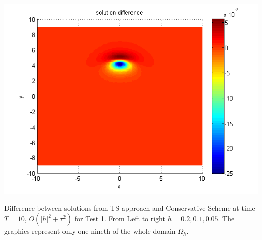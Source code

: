 \documentclass{beamer}
\begin{document}
\begin{frame}
\begin{center}
\begin{minipage}[b]{0.32\linewidth}
		\includegraphics[width=\linewidth]{../amitans/figures/compare_30_bt3_c045_h005.png}
	\end{minipage}
\end{center}
Difference between solutions from TS approach and Conservative Scheme at time $T=10$, $O(|h|^2 + \tau^2)$ for Test 1. From Left to right $h=0.2, 0.1, 0.05$. The graphics represent only one nineth of the whole domain $\Omega_h$.
\end{frame}

\end{document}
